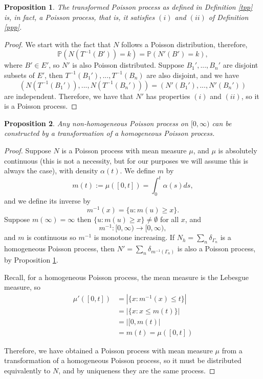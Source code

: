 \documentclass[11pt, oneside]{article}   	%
\newtheorem{proposition}{Proposition}[section]
\theoremstyle{definition}
\theoremstyle{remark}
\begin{document}
\begin{proposition} \label{proptpp}
  The transformed Poisson process as defined in Definition \ref{tpp} is, in fact, a Poisson process, that is, it satisfies $(i)$ and $(ii)$ of Definition \ref{ppp}.
\end{proposition}

\begin{proof}
We start with the fact that $N$ follows a Poisson distribution, therefore,
$$\mathbb{P}(N(T^{-1}(B'))=k) = \mathbb{P}(N'(B')=k),$$
where $B' \in E'$, so $N'$ is also Poisson distributed. Suppose $B_1',...,B_n'$ are disjoint subsets of $E'$, then $T^{-1}(B_1'),...,T^{-1}(B_n)$ are also disjoint, and we have
$$(N(T^{-1}(B_1')),...,N(T^{-1}(B_n'))) = (N'(B_1'),...,N'(B_n'))$$
are independent. Therefore, we have that $N'$ has properties $(i)$ and $(ii)$, so it is a Poisson process.
\end{proof}

\begin{proposition}
Any non-homogeneous Poisson process on $[0, \infty)$ can be constructed by a transformation of a homogeneous Poisson process.
\end{proposition}

\begin{proof}
Suppose $N$ is a Poisson process with mean measure $\mu$, and $\mu$ is absolutely continuous (this is not a necessity, but for our purposes we will assume this is always the case), with density $\alpha(t)$. We define $m$ by
$$m(t) := \mu([0,t]) = \int_0^t \alpha(s) d s,$$
and we define its inverse by
$$m^{-1}(x) = \{u : m(u) \geq x \}.$$
Suppose $m(\infty) = \infty$ then $\{u : m(u) \geq x \} \ne \emptyset$ for all $x$, and $$m^{-1} : [0, \infty) \to [0, \infty),$$
and $m$ is continuous so $m^{-1}$ is monotone increasing.
If $N_h= \sum_{n} \delta_{\Gamma_n}$ is a homogeneous Poisson process, then $N' =\sum_{n} \delta_{m^{-1}(\Gamma_n)}$ is also a Poisson process, by Proposition \ref{proptpp}.

Recall, for a homogeneous Poisson process, the mean measure is the Lebesgue measure, so
\begin{align*}
  \mu'([0,t]) &= |\{x : m^{-1}(x) \leq t\}| \\
	     &= |\{x : x \leq m(t)\}| \\
	     &= |[0,m(t)| \\
	     &= m(t) = \mu([0,t])
\end{align*}

Therefore, we have obtained a Poisson process with mean measure $\mu$ from a transformation of a homogeneous Poisson process, so it must be distributed equivalently to $N$, and by uniqueness they are the same process.
\end{proof}
\end{document}
